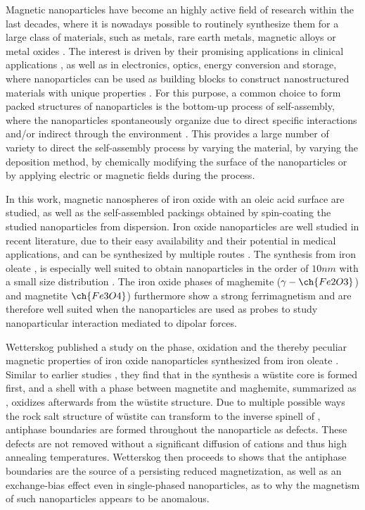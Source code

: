 \documentclass[\main/dresen_thesis.tex]{subfiles}
\begin{document}
  Magnetic nanoparticles have become an highly active field of research within the last decades, where it is nowadays possible to routinely synthesize them for a large class of materials, such as metals, rare earth metals, magnetic alloys or metal oxides \cite{Gubin_2005_Magne}.
  The interest is driven by their promising applications in clinical applications \cite{Thanh_2012_Magne}, as well as in electronics, optics, energy conversion and storage, where nanoparticles can be used as building blocks to construct nanostructured materials with unique properties \cite{Singamaneni_2011_Magne}.
  For this purpose, a common choice to form packed structures of nanoparticles is the bottom-up process of self-assembly, where the nanoparticles spontaneously organize due to direct specific interactions and/or indirect through the environment \cite{Grzelczak_2010_direc, Whitesides_2002_Selfa}.
  This provides a large number of variety to direct the self-assembly process \ie by varying the material, by varying the deposition method, by chemically modifying the surface of the nanoparticles or by applying electric or magnetic fields during the process.

  In this work, magnetic nanospheres of iron oxide with an oleic acid surface are studied, as well as the self-assembled packings obtained by spin-coating the studied nanoparticles from dispersion.
  Iron oxide nanoparticles are well studied in recent literature, due to their easy availability and their potential in medical applications, and can be synthesized by multiple routes \cite{Laurent_2008_Magne}.
  The synthesis from iron oleate \cite{Hyeon_2003_Chemi}, is especially well suited to obtain nanoparticles in the order of $10 \unit{nm}$ with a small size distribution \cite{Wetterskog_2014_Preci}.
  The iron oxide phases of maghemite ($\gamma-\ch{Fe2O3}$) and magnetite $\ch{Fe3O4}$) furthermore show a strong ferrimagnetism and are therefore well suited when the nanoparticles are used as probes to study nanoparticular interaction mediated to dipolar forces.

  Wetterskog \etal published a study on the phase, oxidation and the thereby peculiar magnetic properties of iron oxide nanoparticles synthesized from iron oleate \cite{Wetterskog_2013_Anoma}.
  Similar to earlier studies \cite{Hai_2010_Sizec, Chen_2010_Chara}, they find that in the synthesis a w\"ustite core is formed first, and a shell with a phase between magnetite and maghemite, summarized as , oxidizes afterwards from the w\"ustite structure.
  Due to multiple possible ways the rock salt structure of w\"ustite can transform to the inverse spinell of , antiphase boundaries are formed throughout the nanoparticle as defects.
  These defects are not removed without a significant diffusion of cations \cite{Margulies_1997_Origi} and thus high annealing temperatures.
  Wetterskog \etal then proceeds to shows that the antiphase boundaries are the source of a persisting reduced magnetization, as well as an exchange-bias effect even in single-phased nanoparticles, as to why the magnetism of such nanoparticles appears to be anomalous.
\end{document}
